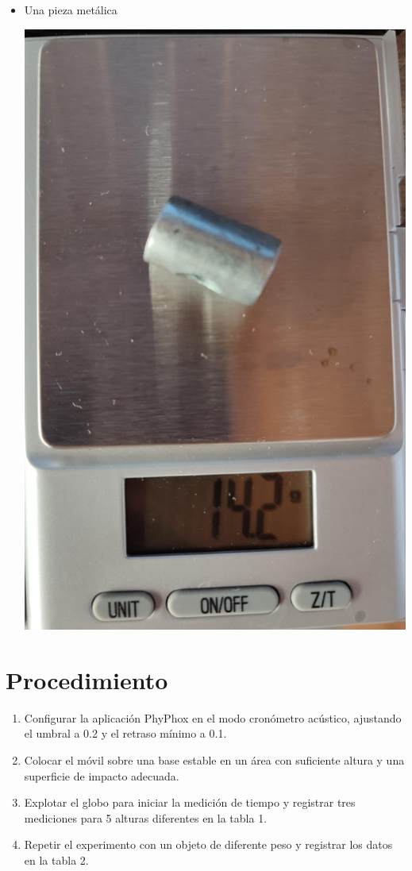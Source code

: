 \begin{multicols}{2}
\begin{itemize}
    \item Una pieza metálica
    \begin{center}
        \includegraphics[scale=0.05]{fig/pieza-metalica.png}
    \end{center}
\end{itemize}

\section*{Procedimiento}
\begin{enumerate}
    \item Configurar la aplicación PhyPhox en el modo cronómetro acústico, ajustando el umbral a 0.2 y el retraso mínimo a 0.1.
    \item Colocar el móvil sobre una base estable en un área con suficiente altura y una superficie de impacto adecuada.
    \item Explotar el globo para iniciar la medición de tiempo y registrar tres mediciones para 5 alturas diferentes en la tabla 1.
    \item Repetir el experimento con un objeto de diferente peso y registrar los datos en la tabla 2.
\end{enumerate}


\end{multicols}
